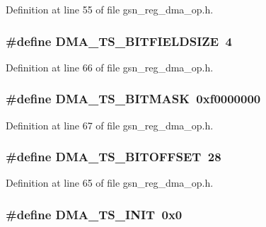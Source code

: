 Definition at line 55 of file gsn\_\-reg\_\-dma\_\-op.h.

\hypertarget{a00547_a072f1546fc8ea82bd5e3434dc3f0822f}{
\subsubsection[{DMA\_\-TS\_\-BITFIELDSIZE}]{\setlength{\rightskip}{0pt plus 5cm}\#define DMA\_\-TS\_\-BITFIELDSIZE~4}}
\label{a00547_a072f1546fc8ea82bd5e3434dc3f0822f}


Definition at line 66 of file gsn\_\-reg\_\-dma\_\-op.h.

\hypertarget{a00547_a6e865711108670ff65f50eebb85c6e6d}{
\subsubsection[{DMA\_\-TS\_\-BITMASK}]{\setlength{\rightskip}{0pt plus 5cm}\#define DMA\_\-TS\_\-BITMASK~0xf0000000}}
\label{a00547_a6e865711108670ff65f50eebb85c6e6d}


Definition at line 67 of file gsn\_\-reg\_\-dma\_\-op.h.

\hypertarget{a00547_a7f2d788f03475a58acf436e9358a977d}{
\subsubsection[{DMA\_\-TS\_\-BITOFFSET}]{\setlength{\rightskip}{0pt plus 5cm}\#define DMA\_\-TS\_\-BITOFFSET~28}}
\label{a00547_a7f2d788f03475a58acf436e9358a977d}


Definition at line 65 of file gsn\_\-reg\_\-dma\_\-op.h.

\hypertarget{a00547_a0bfb3a78fa4daa78b640b8cfd9568247}{
\subsubsection[{DMA\_\-TS\_\-INIT}]{\setlength{\rightskip}{0pt plus 5cm}\#define DMA\_\-TS\_\-INIT~0x0}}
\label{a00547_a0bfb3a78fa4daa78b640b8cfd9568247}


